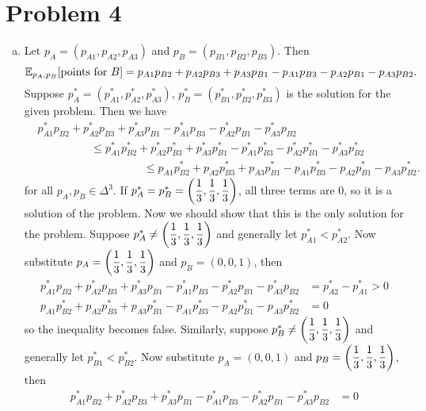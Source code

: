 \documentclass[10pt]{article}
\begin{document}
\section*{Problem 4}
\begin{enumerate}[(a)]
    \item Let $p_A = (p_{A1}, p_{A2}, p_{A3})$ and $p_B = (p_{B1}, p_{B2}, p_{B3})$.
    Then 
    $$\mathbb{E}_{p_A, p_B}\qty[\text{points for }B] = p_{A1}p_{B2} + p_{A2}p_{B3} + p_{A3}p_{B1} - p_{A1}p_{B3} - p_{A2}p_{B1} - p_{A3}p_{B2}.$$
    Suppose $p_A^* = (p_{A1}^*, p_{A2}^*, p_{A3}^*)$, $p_B^* = (p_{B1}^*, p_{B2}^*, p_{B3}^*)$ is the solution for the given problem. Then we have
    \begin{align*}
        &p_{A1}^*p_{B2} + p_{A2}^*p_{B3} + p_{A3}^*p_{B1} - p_{A1}^*p_{B3} - p_{A2}^*p_{B1} - p_{A3}^*p_{B2} \\
        &\hspace{2cm} \leq p_{A1}^*p_{B2}^* + p_{A2}^*p_{B3}^* + p_{A3}^*p_{B1}^* - p_{A1}^*p_{B3}^* - p_{A2}^*p_{B1}^* - p_{A3}^*p_{B2}^* \\
        &\hspace{4cm} \leq p_{A1}p_{B2}^* + p_{A2}p_{B3}^* + p_{A3}p_{B1}^* - p_{A1}p_{B3}^* - p_{A2}p_{B1}^* - p_{A3}p_{B2}^*.
    \end{align*}
    for all $p_A, p_B \in \Delta^3$.
    If $p_A^* = p_B^* = \qty(\dfrac{1}{3}, \dfrac{1}{3}, \dfrac{1}{3})$, all three terms are 0, so it is a solution of the problem.
    Now we should show that this is the only solution for the problem. 
    Suppose $p_A^* \neq \qty(\dfrac{1}{3}, \dfrac{1}{3}, \dfrac{1}{3})$ and generally let $p_{A1}^* < p_{A2}^*$. 
    Now substitute $p_A = \qty(\dfrac{1}{3}, \dfrac{1}{3}, \dfrac{1}{3})$ and $p_B = (0, 0, 1)$, then
    \begin{align*}
        p_{A1}^*p_{B2} + p_{A2}^*p_{B3} + p_{A3}^*p_{B1} - p_{A1}^*p_{B3} - p_{A2}^*p_{B1} - p_{A3}^*p_{B2} &= p_{A2}^* - p_{A1}^* > 0 \\
        p_{A1}p_{B2}^* + p_{A2}p_{B3}^* + p_{A3}p_{B1}^* - p_{A1}p_{B3}^* - p_{A2}p_{B1}^* - p_{A3}p_{B2}^* &= 0
    \end{align*}
    so the inequality becomes false. 
    Similarly, suppose $p_B^* \neq \qty(\dfrac{1}{3}, \dfrac{1}{3}, \dfrac{1}{3})$ and generally let $p_{B1}^* < p_{B2}^*$. 
    Now substitute $p_A = (0, 0, 1)$ and $p_B = \qty(\dfrac{1}{3}, \dfrac{1}{3}, \dfrac{1}{3})$, then
    \begin{align*}
        p_{A1}^*p_{B2} + p_{A2}^*p_{B3} + p_{A3}^*p_{B1} - p_{A1}^*p_{B3} - p_{A2}^*p_{B1} - p_{A3}^*p_{B2} &= 0 \\

\end{align*}
\end{enumerate}
\end{document}
